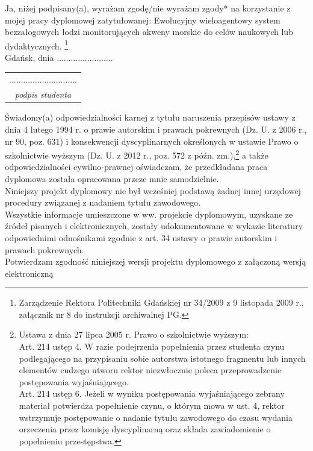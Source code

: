 \documentclass[10pt,a4paper,titlepage,twoside]{report}
\begin{document}
\vspace*{0.5mm}

Ja, niżej podpisany(a), wyrażam zgodę/nie wyrażam zgody* na korzystanie z mojej pracy dyplomowej zatytułowanej: Ewolucyjny wieloagentowy system bezzałogowych łodzi monitorujących akweny morskie
do celów naukowych lub dydaktycznych. \footnote{ Zarządzenie Rektora Politechniki Gdańskiej nr 34/2009 z 9 listopada 2009 r., załącznik nr 8 do instrukcji archiwalnej PG.}\\
Gdańsk, dnia  ........................  \hspace{5cm}
\begin{tabular}{c}
	\\
	  .............................\\
	\small \textit{podpis studenta}
\end{tabular}

\vspace*{0.5mm}

Świadomy(a) odpowiedzialności karnej z tytułu naruszenia przepisów ustawy z dnia 4 lutego 1994 r. o prawie autorskim i prawach pokrewnych (Dz. U. z 2006 r., nr 90, poz. 631) i konsekwencji dyscyplinarnych określonych w ustawie Prawo o szkolnictwie wyższym (Dz. U. z 2012 r., poz. 572 z późn. zm.),\footnote{ Ustawa z dnia 27 lipca 2005 r. Prawo o szkolnictwie wyższym:\\ Art. 214 ustęp 4. W razie podejrzenia popełnienia przez studenta czynu podlegającego na przypisaniu sobie autorstwa istotnego fragmentu lub innych elementów cudzego utworu rektor niezwłocznie poleca przeprowadzenie postępowania wyjaśniającego.\\Art. 214 ustęp 6. Jeżeli w wyniku postępowania wyjaśniającego zebrany materiał potwierdza popełnienie czynu, o którym mowa w ust. 4, rektor wstrzymuje postępowanie o nadanie tytułu zawodowego do czasu wydania orzeczenia przez komisję dyscyplinarną oraz składa zawiadomienie o popełnieniu przestępstwa.} a także odpowiedzialności cywilno-prawnej oświadczam, że przedkładana praca dyplomowa została opracowana przeze mnie samodzielnie.\\
\newline
Niniejszy projekt dyplomowy nie był wcześniej podstawą żadnej innej urzędowej procedury związanej z nadaniem tytułu zawodowego.\\
\newline
Wszystkie informacje umieszczone w ww. projekcie dyplomowym, uzyskane ze źródeł pisanych i elektronicznych, zostały udokumentowane w wykazie literatury odpowiednimi odnośnikami zgodnie z art. 34 ustawy o prawie autorskim i prawach pokrewnych.\\
\newline
Potwierdzam zgodność niniejszej wersji projektu dyplomowego z załączoną wersją elektroniczną\\
\end{document}

